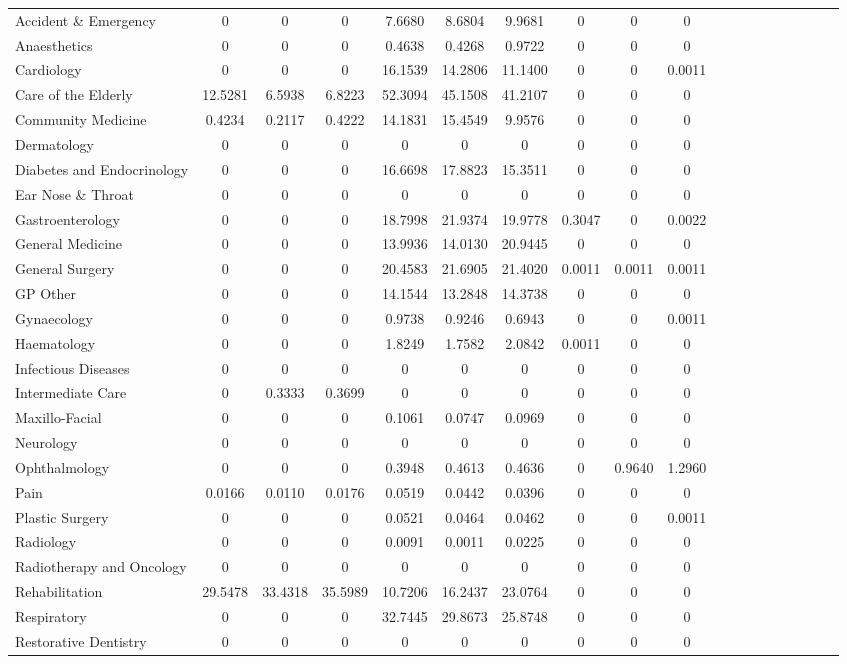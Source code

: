 \documentclass[thesis.tex]{subfiles}
\begin{document}
\begin{landscape}
\begin{table}[h!]
{\begin{tabular}{lcccccccccccccccccc}
Accident \& Emergency&	0&	0&	0&	7.6680&	8.6804&	9.9681&	0&	0	&0\\
Anaesthetics&	0	&0	&0	&0.4638	&0.4268&	0.9722	&0	&0	&0\\
Cardiology&	0	&0	&0	&16.1539&	14.2806&	11.1400	&0	&0	&0.0011\\
Care of the Elderly	&12.5281	&6.5938	&6.8223	&52.3094	&45.1508	&41.2107	&0	&0&	0\\
Community Medicine	&0.4234	&0.2117	&0.4222	&14.1831	&15.4549&	9.9576	&0	&0	&0\\
Dermatology	&0	&0	&0	&0	&0&	0	&0	&0&	0\\
Diabetes and Endocrinology	&0	&0	&0	&16.6698	&17.8823	&15.3511&	0	&0	&0\\
Ear Nose \& Throat	&0	&0	&0&	0	&0	&0	&0&	0	&0\\
Gastroenterology	&0	&0	&0&	18.7998	&21.9374&	19.9778	&0.3047&	0	&0.0022\\
General Medicine	&0	&0	&0	&13.9936	&14.0130&	20.9445	&0&	0	&0\\
General Surgery&	0	&0	&0&	20.4583&	21.6905	&21.4020&	0.0011&	0.0011	&0.0011\\
GP Other	&0	&0	&0	&14.1544&	13.2848	&14.3738&	0&	0	&0\\
Gynaecology	&0	&0	&0	&0.9738	&0.9246	&0.6943	&0	&0	&0.0011\\
Haematology&	0	&0	&0	&1.8249	&1.7582	&2.0842	&0.0011	&0	&0\\
Infectious Diseases	&0	&0	&0	&0	&0	&0	&0	&0	&0\\
Intermediate Care&	0	&0.3333	&0.3699	&0	&0	&0	&0	&0	&0\\
Maxillo-Facial	&0	&0&	0	&0.1061	&0.0747	&0.0969	&0&	0	&0\\
Neurology&	0	&0	&0	&0&	0&	0	&0&	0	&0\\
Ophthalmology&	0	&0	&0&	0.3948	&0.4613&	0.4636&	0&0.9640	&1.2960\\
Pain	&0.0166	&0.0110&0.0176&	0.0519&	0.0442	&0.0396	&0	&0&	0\\
Plastic Surgery	&0	&0	&0	&0.0521&	0.0464	&0.0462	&0&	0	&0.0011\\
Radiology&	0	&0&	0&	0.0091&	0.0011&	0.0225&	0	&0&	0\\
Radiotherapy and Oncology&	0	&0&	0	&0	&0&	0	&0	&0&	0\\
Rehabilitation	&29.5478	&33.4318	&35.5989&	10.7206	&16.2437	&23.0764&	0	&0	&0 \\
Respiratory&	0&	0	&0&	32.7445&	29.8673&	25.8748&	0	&0	&0\\
Restorative Dentistry	&0&	0&	0	&0	&0&	0	&0&	0	&0\\

\end{tabular}}
\end{table}
\end{landscape}
\end{document}
